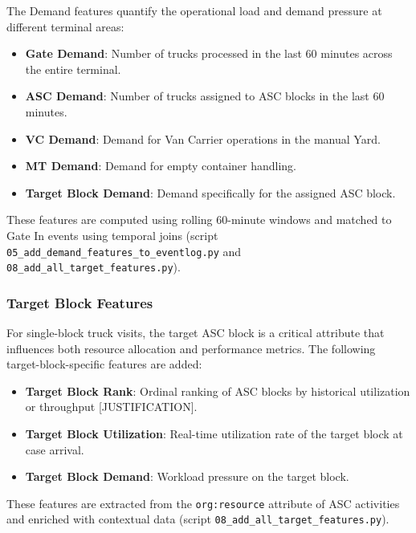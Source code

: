        The Demand features quantify the operational load and demand pressure at different terminal areas:
        
        \begin{itemize}
            \item \textbf{Gate Demand}: Number of trucks processed in the last 60 minutes across the entire terminal.
            \item \textbf{ASC Demand}: Number of trucks assigned to ASC blocks in the last 60 minutes.
            \item \textbf{VC Demand}: Demand for Van Carrier operations in the manual Yard.
            \item \textbf{MT Demand}: Demand for empty container handling.
            \item \textbf{Target Block Demand}: Demand specifically for the assigned ASC block.
        \end{itemize}
        
        These features are computed using rolling 60-minute windows and matched to Gate In events using temporal joins (script \texttt{05\_add\_demand\_features\_to\_eventlog.py} and \texttt{08\_add\_all\_target\_features.py}).        

        \subsubsection{Target Block Features}
    
        For single-block truck visits, the target ASC block is a critical attribute that influences both resource allocation and performance metrics. The following target-block-specific features are added:
        
        \begin{itemize}
            \item \textbf{Target Block Rank}: Ordinal ranking of ASC blocks by historical utilization or throughput [JUSTIFICATION].
            \item \textbf{Target Block Utilization}: Real-time utilization rate of the target block at case arrival.
            \item \textbf{Target Block Demand}: Workload pressure on the target block.
        \end{itemize}
        
        These features are extracted from the \texttt{org:resource} attribute of ASC activities and enriched with contextual data (script \texttt{08\_add\_all\_target\_features.py}).
      
